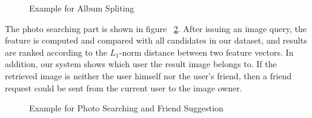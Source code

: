 \documentclass[10pt,twocolumn,letterpaper]{article}
\begin{document}
\begin{figure}[t]
\begin{center}
\end{center}
\caption{Example for Album Spliting}
\label{fig:split}
\end{figure}

The photo searching part is shown in figure ~\ref{fig:suggestion}. After issuing an image query, the feature is computed and compared with all candidates in our dataset, and results are ranked according to the $L_1$-norm distance between two feature vectors. In addition, our system shows which user the result image belongs to. If the retrieved image is neither the user himself nor the user's friend, then a friend request could be sent from the current user to the image owner.

\begin{figure}[t]
\begin{center}
\end{center}
\caption{Example for Photo Searching and Friend Suggestion}
\label{fig:suggestion}
\end{figure}

\end{document}
